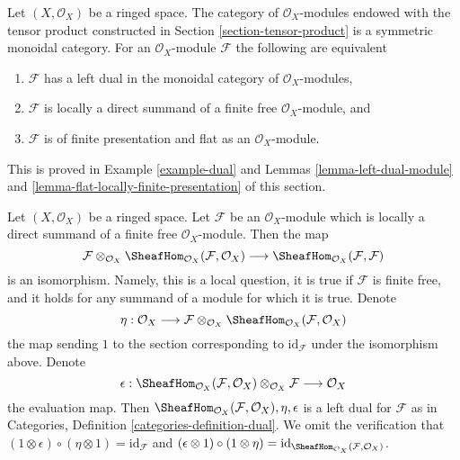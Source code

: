 \noindent
Let $(X, \mathcal{O}_X)$ be a ringed space. The category of
$\mathcal{O}_X$-modules endowed with the tensor product
constructed in Section \ref{section-tensor-product}
is a symmetric monoidal category. For an $\mathcal{O}_X$-module
$\mathcal{F}$ the following are equivalent
\begin{enumerate}
\item $\mathcal{F}$ has a left dual in the monoidal category
of $\mathcal{O}_X$-modules,
\item $\mathcal{F}$ is locally a direct summand of a finite
free $\mathcal{O}_X$-module, and
\item $\mathcal{F}$ is of finite presentation and flat as an
$\mathcal{O}_X$-module.
\end{enumerate}
This is proved in Example \ref{example-dual} and
Lemmas \ref{lemma-left-dual-module} and
\ref{lemma-flat-locally-finite-presentation} of this section.

\begin{example}
\label{example-dual}
Let $(X, \mathcal{O}_X)$ be a ringed space. Let $\mathcal{F}$
be an $\mathcal{O}_X$-module which is locally a direct summand of a finite
free $\mathcal{O}_X$-module. Then the map
$$
\mathcal{F} \otimes_{\mathcal{O}_X}
\SheafHom_{\mathcal{O}_X}(\mathcal{F}, \mathcal{O}_X)
\longrightarrow
\SheafHom_{\mathcal{O}_X}(\mathcal{F}, \mathcal{F})
$$
is an isomorphism. Namely, this is a local question, it is true
if $\mathcal{F}$ is finite free, and it holds for any summand
of a module for which it is true. Denote
$$
\eta :
\mathcal{O}_X
\longrightarrow
\mathcal{F} \otimes_{\mathcal{O}_X}
\SheafHom_{\mathcal{O}_X}(\mathcal{F}, \mathcal{O}_X)
$$
the map sending $1$ to the section corresponding to
$\text{id}_\mathcal{F}$ under the isomorphism above.
Denote
$$
\epsilon : 
\SheafHom_{\mathcal{O}_X}(\mathcal{F}, \mathcal{O}_X)
\otimes_{\mathcal{O}_X} \mathcal{F}
\longrightarrow
\mathcal{O}_X
$$
the evaluation map. Then
$\SheafHom_{\mathcal{O}_X}(\mathcal{F}, \mathcal{O}_X), \eta, \epsilon$
is a left dual for $\mathcal{F}$ as in
Categories, Definition \ref{categories-definition-dual}.
We omit the verification that
$(1 \otimes \epsilon) \circ (\eta \otimes 1) = \text{id}_\mathcal{F}$
and
$(\epsilon \otimes 1) \circ (1 \otimes \eta) =
\text{id}_{\SheafHom_{\mathcal{O}_X}(\mathcal{F}, \mathcal{O}_X)}$.
\end{example}

